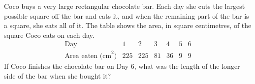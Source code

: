 Coco buys a very large rectangular chocolate bar. Each day she cuts the largest possible square off the bar and eats it, and when the remaining part of the bar is a square, she eats all of it. The table shows the area, in square centimetres, of the square Coco eats on each day.
\[
\begin{array}{c|cccccc}
\text{Day} & 1 & 2 & 3 & 4 & 5 & 6\\\hline
\text{Area eaten (cm}^2) & 225 & 225 & 81 & 36 & 9 & 9
\end{array}
\]
If Coco finishes the chocolate bar on Day $6$, what was the length of the longer side of the bar when she bought it?
